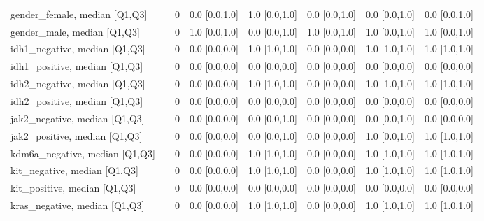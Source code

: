 \begin{tabular}{llllllll}
gender\_female, median [Q1,Q3] &    &                    0 &     0.0 [0.0,1.0] &           1.0 [0.0,1.0] &     0.0 [0.0,1.0] &             0.0 [0.0,1.0] &             0.0 [0.0,1.0] \\
gender\_male, median [Q1,Q3] &    &                    0 &     1.0 [0.0,1.0] &           0.0 [0.0,1.0] &     1.0 [0.0,1.0] &             1.0 [0.0,1.0] &             1.0 [0.0,1.0] \\
idh1\_negative, median [Q1,Q3] &    &                    0 &     0.0 [0.0,0.0] &           1.0 [1.0,1.0] &     0.0 [0.0,0.0] &             1.0 [1.0,1.0] &             1.0 [1.0,1.0] \\
idh1\_positive, median [Q1,Q3] &    &                    0 &     0.0 [0.0,0.0] &           0.0 [0.0,0.0] &     0.0 [0.0,0.0] &             0.0 [0.0,0.0] &             0.0 [0.0,0.0] \\
idh2\_negative, median [Q1,Q3] &    &                    0 &     0.0 [0.0,0.0] &           1.0 [1.0,1.0] &     0.0 [0.0,0.0] &             1.0 [1.0,1.0] &             1.0 [1.0,1.0] \\
idh2\_positive, median [Q1,Q3] &    &                    0 &     0.0 [0.0,0.0] &           0.0 [0.0,0.0] &     0.0 [0.0,0.0] &             0.0 [0.0,0.0] &             0.0 [0.0,0.0] \\
jak2\_negative, median [Q1,Q3] &    &                    0 &     0.0 [0.0,0.0] &           0.0 [0.0,1.0] &     0.0 [0.0,0.0] &             0.0 [0.0,1.0] &             0.0 [0.0,0.0] \\
jak2\_positive, median [Q1,Q3] &    &                    0 &     0.0 [0.0,0.0] &           0.0 [0.0,1.0] &     0.0 [0.0,0.0] &             1.0 [0.0,1.0] &             1.0 [1.0,1.0] \\
kdm6a\_negative, median [Q1,Q3] &    &                    0 &     0.0 [0.0,0.0] &           1.0 [1.0,1.0] &     0.0 [0.0,0.0] &             1.0 [1.0,1.0] &             1.0 [1.0,1.0] \\
kit\_negative, median [Q1,Q3] &    &                    0 &     0.0 [0.0,0.0] &           1.0 [1.0,1.0] &     0.0 [0.0,0.0] &             1.0 [1.0,1.0] &             1.0 [1.0,1.0] \\
kit\_positive, median [Q1,Q3] &    &                    0 &     0.0 [0.0,0.0] &           0.0 [0.0,0.0] &     0.0 [0.0,0.0] &             0.0 [0.0,0.0] &             0.0 [0.0,0.0] \\
kras\_negative, median [Q1,Q3] &    &                    0 &     0.0 [0.0,0.0] &           1.0 [1.0,1.0] &     0.0 [0.0,0.0] &             1.0 [1.0,1.0] &             1.0 [1.0,1.0] \\

\end{tabular}
